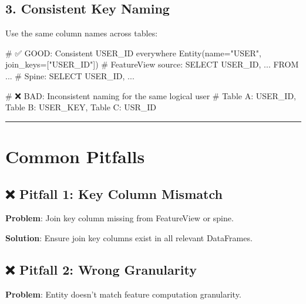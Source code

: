 \documentclass[
  letterpaper,
  DIV=11,
  numbers=noendperiod]{scrreprt}
\newenvironment{Shaded}{\begin{snugshade}}{\end{snugshade}}
\newcommand{\CommentTok}[1]{\textcolor[rgb]{0.37,0.37,0.37}{#1}}
\newcommand{\NormalTok}[1]{\textcolor[rgb]{0.00,0.23,0.31}{#1}}
\newcommand{\OperatorTok}[1]{\textcolor[rgb]{0.37,0.37,0.37}{#1}}
\newcommand{\StringTok}[1]{\textcolor[rgb]{0.13,0.47,0.30}{#1}}
\begin{document}
\hypertarget{consistent-key-naming}{%
\subsection{3. Consistent Key Naming}\label{consistent-key-naming}}

Use the same column names across tables:

\begin{Shaded}
\begin{Highlighting}[]
\CommentTok{\# ✅ GOOD: Consistent USER\_ID everywhere}
\NormalTok{Entity(name}\OperatorTok{=}\StringTok{"USER"}\NormalTok{, join\_keys}\OperatorTok{=}\NormalTok{[}\StringTok{"USER\_ID"}\NormalTok{])}
\CommentTok{\# FeatureView source: SELECT USER\_ID, ... FROM ...}
\CommentTok{\# Spine: SELECT USER\_ID, ...}

\CommentTok{\# ❌ BAD: Inconsistent naming for the same logical user}
\CommentTok{\# Table A: USER\_ID, Table B: USER\_KEY, Table C: USR\_ID}
\end{Highlighting}
\end{Shaded}

\begin{center}\rule{0.5\linewidth}{0.5pt}\end{center}

\hypertarget{common-pitfalls-1}{%
\section{Common Pitfalls}\label{common-pitfalls-1}}

\hypertarget{pitfall-1-key-column-mismatch}{%
\subsection{❌ Pitfall 1: Key Column
Mismatch}\label{pitfall-1-key-column-mismatch}}

\textbf{Problem}: Join key column missing from FeatureView or spine.

\textbf{Solution}: Ensure join key columns exist in all relevant
DataFrames.

\hypertarget{pitfall-2-wrong-granularity}{%
\subsection{❌ Pitfall 2: Wrong
Granularity}\label{pitfall-2-wrong-granularity}}

\textbf{Problem}: Entity doesn't match feature computation granularity.
\end{document}
